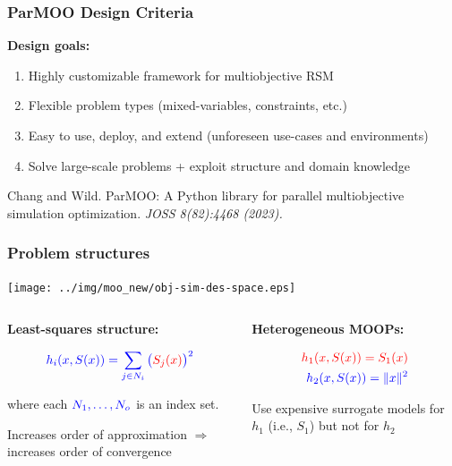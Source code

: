 \documentclass[aspectratio=169]{beamer}
\begin{document}
\begin{frame}\frametitle{ParMOO Design Criteria}

{\large
\textbf{Design goals:}}

\medskip

\begin{enumerate}
\item Highly customizable framework for multiobjective RSM
\item Flexible problem types (mixed-variables, constraints, etc.)
\item Easy to use, deploy, and extend (unforeseen use-cases and environments)
\item Solve large-scale problems + exploit structure and domain knowledge
\end{enumerate}

\vfill

{\tiny
Chang and Wild.
ParMOO: A Python library for parallel multiobjective simulation optimization.
{\sl JOSS 8(82):4468 (2023).}
}
\end{frame}

\begin{frame}\frametitle{Problem structures}
\begin{center}
\texttt{[image: ../img/moo\_new/obj-sim-des-space.eps]}
\end{center}
\begin{columns}
\begin{column}{0.5\textwidth}
\textbf{Least-squares structure:}

\medskip

{\large
$$
{\color{blue} h_i(x, S(x)) = \sum_{j \in N_i} \big({\color{red}S_j(x)}\big)^2}
$$

where each ${\color{blue} N_1, \ldots, N_o}$ is an index set.
}

\bigskip

Increases order of approximation $\Rightarrow$
increases order of convergence

\end{column}
\begin{column}{0.5\textwidth}
\textbf{Heterogeneous MOOPs:}

{\large
\begin{align*}
{\color{red} h_1(x, S(x)) = S_1(x)}\\
{\color{blue} h_2(x, S(x)) = \|x \|^2}
\end{align*}
}

Use expensive surrogate models for {\color{red} $h_1$} (i.e.,
{\color{red} $S_1$}) but not for {\color{blue} $h_2$}

\end{column}
\end{columns}
\end{frame}
\end{document}
